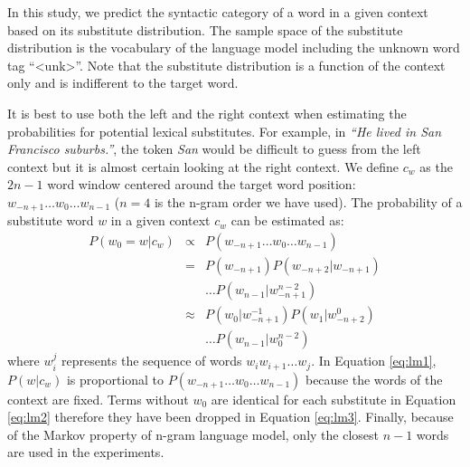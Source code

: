 
\appendix

\label{app:subcomp}

In this study, we predict the syntactic category of a word in a given
context based on its substitute distribution.  The sample space of the
substitute distribution is the vocabulary of the language model
including the unknown word tag ``<unk>''.  Note that the substitute
distribution is a function of the context only and is indifferent to
the target word.


It is best to use both the left and the right context when estimating
the probabilities for potential lexical substitutes.  For example, in
\emph{``He lived in San Francisco suburbs.''}, the token \emph{San}
would be difficult to guess from the left context but it is almost
certain looking at the right context.  We define $c_w$ as the $2n-1$
word window centered around the target word position: $w_{-n+1} \ldots
w_0 \ldots w_{n-1}$ ($n=4$ is the n-gram order we have used).  The
probability of a substitute word $w$ in a given context $c_w$ can be
estimated as:
\begin{eqnarray}
  \label{eq:lm1}P(w_0 = w | c_w) & \propto & P(w_{-n+1}\ldots w_0\ldots w_{n-1})\\
  \label{eq:lm2}& = & P(w_{-n+1})P(w_{-n+2}|w_{-n+1})\nonumber\\
  &&\ldots P(w_{n-1}|w_{-n+1}^{n-2})\\
  \label{eq:lm3}& \approx & P(w_0| w_{-n+1}^{-1})P(w_{1}|w_{-n+2}^0)\nonumber\\
  &&\ldots P(w_{n-1}|w_0^{n-2})
\end{eqnarray}
where $w_i^j$ represents the sequence of words $w_i w_{i+1} \ldots
w_{j}$.  In Equation \ref{eq:lm1}, $P(w|c_w)$ is proportional to
$P(w_{-n+1}\ldots w_0 \ldots w_{n-1})$ because the words of the
context are fixed.  Terms without $w_0$ are identical for each
substitute in Equation \ref{eq:lm2} therefore they have been dropped
in Equation \ref{eq:lm3}.  Finally, because of the Markov property of
n-gram language model, only the closest $n-1$ words are used in the
experiments.

